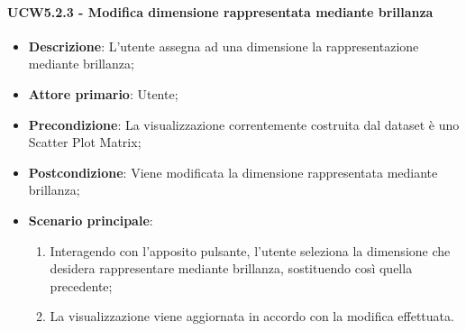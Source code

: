 \paragraph{UCW5.2.3 - Modifica dimensione rappresentata mediante brillanza}
\label{par:ucw5.2.3}
\begin{itemize}

    \item \textbf{Descrizione}:     L'utente assegna ad una dimensione la rappresentazione mediante brillanza;
    \item \textbf{Attore primario}: Utente;
    \item \textbf{Precondizione}:   La visualizzazione correntemente costruita dal dataset è uno Scatter Plot Matrix;
    \item \textbf{Postcondizione}:  Viene modificata la dimensione rappresentata mediante brillanza;
    \item \textbf{Scenario principale}:
    \begin{enumerate}
        \item   Interagendo con l'apposito pulsante, l'utente seleziona la dimensione che desidera rappresentare
                mediante brillanza, sostituendo così quella precedente;

        \item   La visualizzazione viene aggiornata in accordo con la modifica effettuata.
    \end{enumerate}
\end{itemize}

